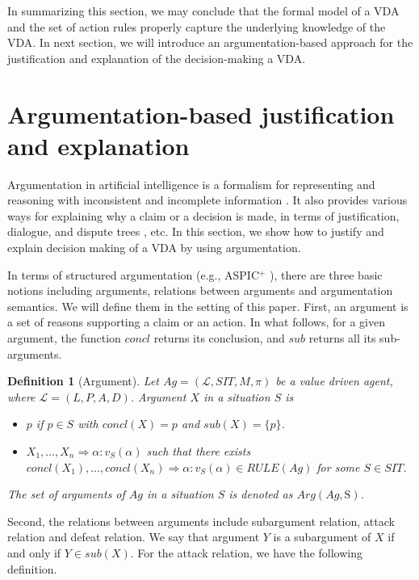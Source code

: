 \documentclass[letterpaper]{article} %
\newtheorem{definition}{Definition}
\begin{document}
In summarizing this section, we may conclude that the formal model of a VDA and the set of action rules properly capture the underlying knowledge of the VDA. In next section, we will introduce an argumentation-based approach for the justification and explanation of the decision-making a VDA. 

\section{Argumentation-based justification and explanation}
Argumentation in artificial intelligence is a formalism for representing and reasoning with inconsistent and incomplete information \cite{DBLP:journals/ai/Dung95}. It also provides various ways for explaining why a claim or a decision is made, in terms of justification, dialogue, and dispute trees \cite{DBLP:conf/comma/CyrasST16}, etc. In this section, we show how to justify and explain decision making of a VDA by using argumentation. 

In terms of structured argumentation (e.g., ASPIC$^+$ \cite{DBLP:journals/argcom/ModgilP14}), there are three basic notions including arguments, relations between arguments and argumentation semantics. We will define them in the setting of this paper. First, an argument is a set of reasons supporting a claim or an action. In what follows, for a given argument, the function $concl$ returns its conclusion, and $sub$ returns all its sub-arguments.
\begin{definition}[Argument]\label{def-arg}
Let $Ag = (\mathcal{L},  SIT, M, \pi)$ be a value driven agent, where $\mathcal{L} = (L, P, A, D)$. 
Argument $X$ in a situation $S$ is
\begin{itemize}
\item $p$ if $p\in S$ with $concl(X)=p$ and $sub(X) = \{p\}$.
\item $X_1, \dots, X_n \Rightarrow \alpha: v_{S}(\alpha)$ such that there exists $concl(X_1), \dots, concl(X_n) \Rightarrow \alpha: v_{S}(\alpha) \in RULE(Ag)$ for some ${S}\in SIT$. %
\end{itemize}
The set of arguments of $Ag$ in a situation $S$ is denoted as $Arg(Ag, \mathrm{S})$. 
\end{definition}

Second, the relations between arguments include subargument relation, attack relation and defeat relation. We say that argument $Y$ is a subargument of $X$ if and only if $Y\in sub(X)$. For the attack relation, we have the following definition. 
\end{document}
